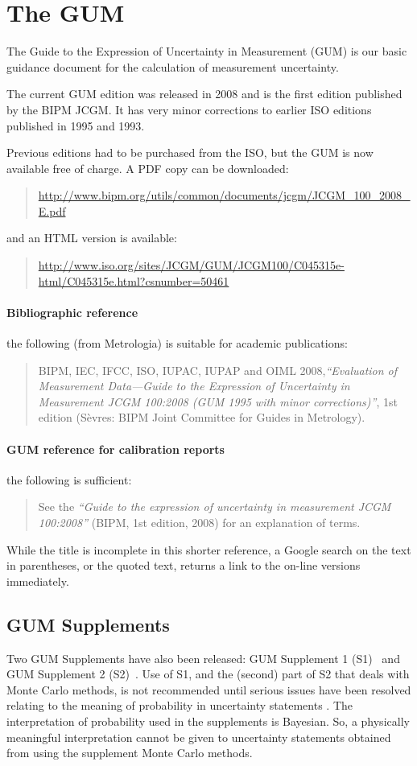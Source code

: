 \section{The GUM}
The Guide to the Expression of Uncertainty in Measurement (GUM) is our basic guidance document for the calculation of measurement uncertainty. 

The current GUM edition was released in 2008 and is the first edition published by the BIPM JCGM. It has very minor corrections to earlier ISO editions published in 1995 and 1993. 

Previous editions had to be purchased from the ISO, but the GUM is now available free of charge. A PDF copy can be downloaded:
\begin{quote}
\url{http://www.bipm.org/utils/common/documents/jcgm/JCGM_100_2008_E.pdf}
\end{quote}
and an HTML version is available:
\begin{quote}
\url{http://www.iso.org/sites/JCGM/GUM/JCGM100/C045315e-html/C045315e.html?csnumber=50461}
\end{quote}

\paragraph{Bibliographic reference} the following (from Metrologia) is suitable for academic publications: 
\begin{quote}
BIPM, IEC, IFCC, ISO, IUPAC, IUPAP and OIML 2008,\textit{``Evaluation of Measurement Data—Guide to the Expression of Uncertainty in Measurement JCGM 100:2008 (GUM 1995 with minor corrections)''}, 1st edition (S\`evres: BIPM Joint Committee for Guides in Metrology). 
\end{quote}

\paragraph{GUM reference for calibration reports}
the following is sufficient:
\begin{quote}
See the \textit{``Guide to the expression of uncertainty in measurement JCGM 100:2008''} (BIPM, 1st edition, 2008) for an explanation of terms.
\end{quote}
While the title is incomplete in this shorter reference, a Google search on the text in parentheses, or the quoted text, returns a link to the on-line versions immediately.

\subsection{GUM Supplements}
Two GUM Supplements have also been released: GUM Supplement 1 (S1)~\cite{GUM_S1} and GUM Supplement 2 (S2)~\cite{GUM_S2}. Use of S1, and the (second) part of S2 that deals with Monte Carlo methods, is not recommended until serious issues have been resolved relating to the meaning of probability in uncertainty statements \cite{WHITE_16}. The interpretation of probability used in the supplements is Bayesian. So, a physically meaningful interpretation cannot be given to uncertainty statements obtained from using the supplement Monte Carlo methods. 


